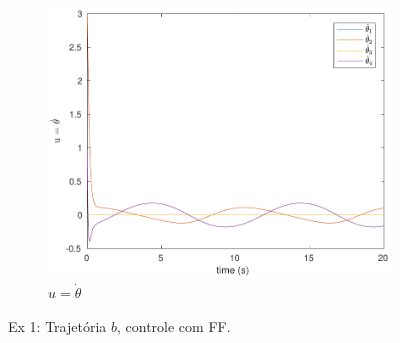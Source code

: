 \documentclass[a4paper,11pt]{article}
\theoremstyle{mytheor}
\begin{document}
\begin{figure}[!ht]
\begin{minipage}{\linewidth}
\begin{subfigure}[b]{0.4\textwidth}
    \end{subfigure}
    \begin{subfigure}[b]{0.4\textwidth}
    \includegraphics[width=1\textwidth]{figs/ex1_b_1_dq.pdf}
    \caption{$u = \dot{\theta}$}
    \label{fig:ex1_b_1_dq}
    \end{subfigure}
  \end{minipage}
\caption{Ex 1: Trajetória $b$, controle com FF.}
\label{fig:ex1_b_1}
\end{figure}
\end{document}
